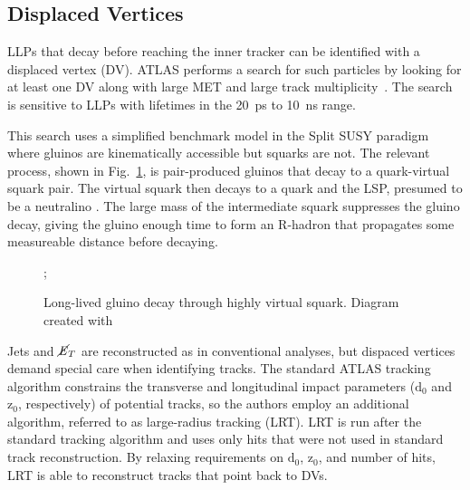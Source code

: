 \documentclass[12pt]{article}
\begin{document}
    \subsection{Displaced Vertices}
        LLPs that decay before reaching the inner tracker can be identified with a displaced vertex (DV). ATLAS performs a search for such particles by looking for at least one DV along with large MET and large track multiplicity~\cite{atlas_displaced}. The search is sensitive to LLPs with lifetimes in the \SI{20}{\pico\s} to \SI{10}{\nano\s} range.

        This search uses a simplified benchmark model in the Split SUSY paradigm where gluinos are kinematically accessible but squarks are not. The relevant process, shown in Fig.~\ref{displaced_process}, is pair-produced gluinos that decay to a quark-virtual squark pair. The virtual squark then decays to a quark and the LSP, presumed to be a neutralino . The large mass of the intermediate squark suppresses the gluino decay, giving the gluino enough time to form an R-hadron that propagates some measureable distance before decaying. 

        \noindent \begin{figure}[htbp] \begin{center}
        ;
        \caption{Long-lived gluino decay through highly virtual squark. Diagram created with~\cite{tikz}}
        \label{displaced_process}
        \end{center} \end{figure}

        Jets and $\cancel{\it{E}}_{T}$ are reconstructed as in conventional analyses, but dispaced vertices demand special care when identifying tracks. The standard ATLAS tracking algorithm constrains the transverse and longitudinal impact parameters ($\mathrm{d}_0$ and $\mathrm{z}_0$, respectively) of potential tracks, so the authors employ an additional algorithm, referred to as large-radius tracking (LRT). LRT is run after the standard tracking algorithm and uses only hits that were not used in standard track reconstruction. By relaxing requirements on $\mathrm{d}_0$, $\mathrm{z}_0$, and number of hits, LRT is able to reconstruct tracks that point back to DVs.
        
\end{document}
